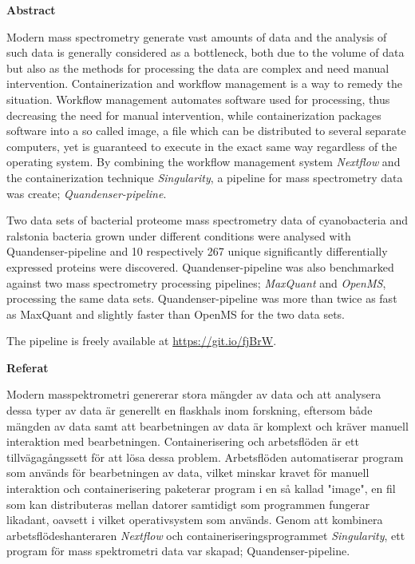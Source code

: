 \begin{center}\normalfont\Large\bfseries\centering Abstract\end{center}
Modern mass spectrometry generate vast amounts of data and the analysis of such data is generally considered as a bottleneck, both due to the volume of data but also as the methods for processing the data are complex and need manual intervention. Containerization and workflow management is a way to remedy the situation. Workflow management automates software used for processing, thus decreasing the need for manual intervention, while containerization packages software into a so called image, a file which can be distributed to several separate computers, yet is guaranteed to execute in the exact same way regardless of the operating system. By combining the workflow management system \textit{Nextflow} and the containerization technique \textit{Singularity}, a pipeline for mass spectrometry data was create; \textit{Quandenser-pipeline}.

Two data sets of bacterial proteome mass spectrometry data of cyanobacteria and ralstonia bacteria grown under different conditions were analysed with Quandenser-pipeline and 10 respectively 267 unique significantly differentially expressed proteins were discovered. Quandenser-pipeline was also benchmarked against two mass spectrometry processing pipelines; \textit{MaxQuant} and \textit{OpenMS}, processing the same data sets. Quandenser-pipeline was more than twice as fast as MaxQuant and slightly faster than OpenMS for the two data sets.

The pipeline is freely available at \url{https://git.io/fjBrW}.

\newpage

\begin{center}\normalfont\Large\bfseries\centering Referat\end{center}
Modern masspektrometri genererar stora mängder av data och att analysera dessa typer av data är generellt en flaskhals inom forskning, eftersom både mängden av data samt att bearbetningen av data är komplext och kräver manuell interaktion med bearbetningen. Containerisering och arbetsflöden är ett tillvägagångssett för att lösa dessa problem. Arbetsflöden automatiserar program som används för bearbetningen av data, vilket minskar kravet för manuell interaktion och containerisering paketerar program i en så kallad "image", en fil som kan distributeras mellan datorer samtidigt som programmen fungerar likadant, oavsett i vilket operativsystem som används. Genom att kombinera arbetsflödeshanteraren \textit{Nextflow} och containeriseringsprogrammet \textit{Singularity}, ett program för mass spektrometri data var skapad; Quandenser-pipeline.

